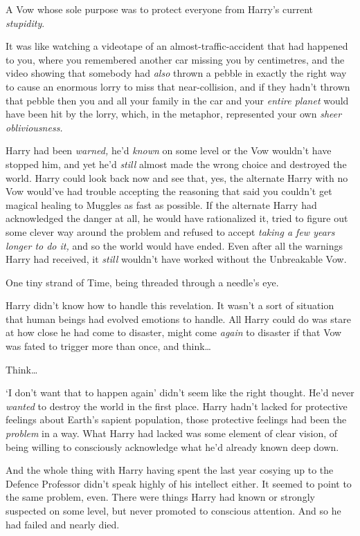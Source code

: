 A Vow whose sole purpose was to protect everyone from Harry’s current \emph{stupidity}.

It was like watching a videotape of an almost-traffic-accident that had happened to you, where you remembered another car missing you by centimetres, and the video showing that somebody had \emph{also} thrown a pebble in exactly the right way to cause an enormous lorry to miss that near-collision, and if they hadn’t thrown that pebble then you and all your family in the car and your \emph{entire planet} would have been hit by the lorry, which, in the metaphor, represented your own \emph{sheer obliviousness.}

Harry had been \emph{warned,} he’d \emph{known} on some level or the Vow wouldn’t have stopped him, and yet he’d \emph{still} almost made the wrong choice and destroyed the world. Harry could look back now and see that, yes, the alternate Harry with no Vow would’ve had trouble accepting the reasoning that said you couldn’t get magical healing to Muggles as fast as possible. If the alternate Harry had acknowledged the danger at all, he would have rationalized it, tried to figure out some clever way around the problem and refused to accept \emph{taking a few years longer to do it,} and so the world would have ended. Even after all the warnings Harry had received, it \emph{still} wouldn’t have worked without the Unbreakable Vow.

One tiny strand of Time, being threaded through a needle’s eye.

Harry didn’t know how to handle this revelation. It wasn’t a sort of situation that human beings had evolved emotions to handle. All Harry could do was stare at how close he had come to disaster, might come \emph{again} to disaster if that Vow was fated to trigger more than once, and think…

Think…

‘I don’t want that to happen again’ didn’t seem like the right thought. He’d never \emph{wanted} to destroy the world in the first place. Harry hadn’t lacked for protective feelings about Earth’s sapient population, those protective feelings had been the \emph{problem} in a way. What Harry had lacked was some element of clear vision, of being willing to consciously acknowledge what he’d already known deep down.

And the whole thing with Harry having spent the last year cosying up to the Defence Professor didn’t speak highly of his intellect either. It seemed to point to the same problem, even. There were things Harry had known or strongly suspected on some level, but never promoted to conscious attention. And so he had failed and nearly died.

